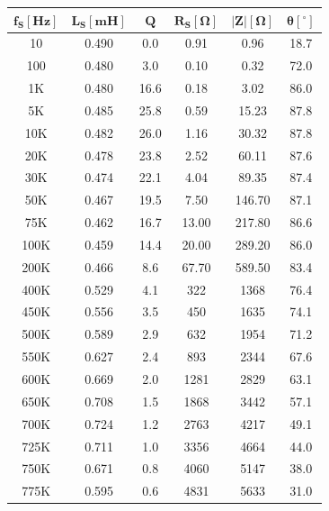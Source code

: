 \documentclass[11pt, a4paper]{article}
\begin{document}
 \begin{center}
     \begin{table}[H]
     \centering
     \renewcommand{\arraystretch}{1.1}
         \begin{tabular}{ c c c c c c }
            \hline 
             $\bm{f_S[Hz]}$ &  $\bm{L_S[mH]}$ & $\bm{Q}$& $\bm{R_S[\Omega]}$ & $\bm{|Z|[\Omega]}$ & $\bm{\theta}[^\circ]$ \\
             \hline
                10		& 0.490        & 0.0    & 0.91 		& 0.96  & 18.7   \\
				100 	& 0.480       & 3.0   	 & 0.10  	& 0.32  & 72.0     \\
				1K    & 0.480         & 16.6	& 0.18 		& 3.02  & 86.0     \\
				5K    & 0.485        & 25.8 	& 0.59		 & 15.23 & 87.8   \\
				10K   & 0.482        & 26.0     & 1.16 		& 30.32 & 87.8   \\
				20K   & 0.478       & 23.8 		& 2.52 		& 60.11 & 87.6   \\
				30K   & 0.474       & 22.1 		& 4.04 		& 89.35 & 87.4  \\
				50K   & 0.467        & 19.5		 & 7.50 		 & 146.70 & 87.1  \\
				75K   & 0.462       & 16.7 		& 13.00   	& 217.80 & 86.6  \\
				100K  & 0.459       & 14.4 		& 20.00  	 & 289.20 & 86.0   \\
				200K  & 0.466       & 8.6  		& 67.70 	& 589.50 & 83.4    \\
				400K  & 0.529        & 4.1 		 & 322 		 & 1368  & 76.4   \\
				450K  & 0.556        & 3.5 		 & 450  	& 1635  & 74.1   \\
				500K  & 0.589        & 2.9 		 & 632 		 & 1954  & 71.2  \\
				550K  & 0.627        & 2.4  	& 893  		& 2344  & 67.6    \\
				600K  & 0.669        & 2.0    & 1281 		& 2829  & 63.1   \\
				650K  & 0.708        & 1.5 		 & 1868 	& 3442  & 57.1    \\
				700K  & 0.724       & 1.2  		& 2763 		& 4217  & 49.1    \\
				725K  & 0.711        & 1.0  	  & 3356	 & 4664  & 44.0    \\
				750K  & 0.671       & 0.8 		 & 4060 	& 5147  & 38.0    \\
				775K  & 0.595       & 0.6 		 & 4831 	& 5633  & 31.0       \\

\end{tabular}
\end{table}
\end{center}
\end{document}
